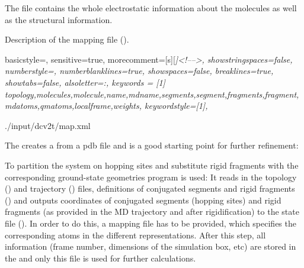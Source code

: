 The file \xmlcsg contains the whole electrostatic information about the molecules as well as the structural information. 
%
\begin{table}[h]
\label{tab:map}
\caption{Description of the \xml mapping file (\xmlcsg).}
\end{table}
%
 {
   basicstyle=\ttfamily\scriptsize,
   sensitive=true,
   morecomment=[s][\color{gray}\rmfamily\itshape]{<!--}{-->}, 
   showstringspaces=false,
   numberstyle=\scriptsize,
   numberblanklines=true,
   showspaces=false,
   breaklines=true,
   showtabs=false,
   alsoletter={:},
   keywords = [1]
   { topology,molecules,molecule,name,mdname,segments,segment,fragments,fragment,mdatoms,qmatoms,localframe,weights},
   keywordstyle={[1]\color{blue}},
}

%
{./input/dcv2t/map.xml}

The  creates a \xmlcsg from a pdb file and is a good starting point for further refinement: 


To partition the system on hopping sites and substitute rigid fragments with the corresponding ground-state geometries \ctpmap program is used:
It reads in the \gromacs topology (\topology) and trajectory (\trajectory) files, definitions of conjugated segments and rigid fragments (\xmlcsg) and outputs coordinates of conjugated segments (hopping sites) and rigid fragments (as provided in the MD trajectory and after rigidification) to the  state file (\sqlstate). In order to do this, a mapping file \xmlcsg has to be provided, which specifies the corresponding atoms in the different representations. After this step, all information (frame number, dimensions of the simulation box, etc) are stored in the  and only this file is used for further calculations.


